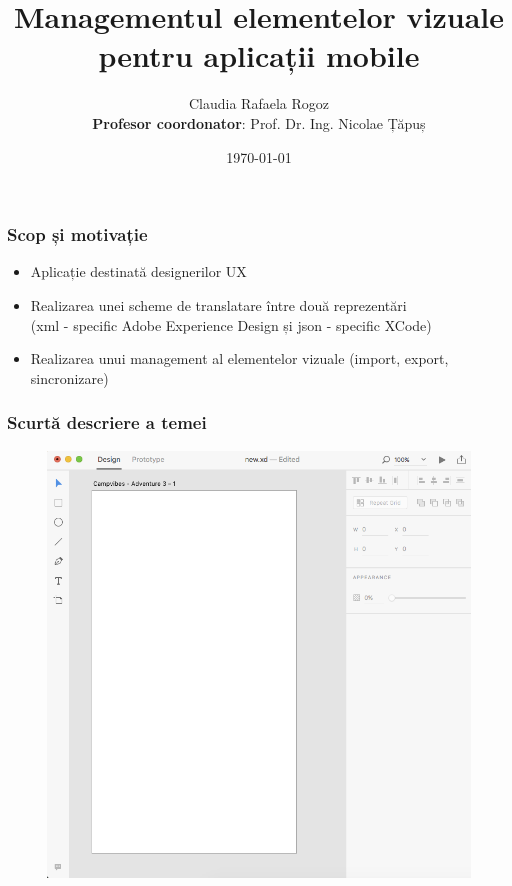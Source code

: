 \documentclass{beamer}
\title[Short title]{Managementul elementelor vizuale \\pentru aplicații mobile} %
\author{Claudia Rafaela Rogoz\\
  \textbf{Profesor coordonator}: Prof. Dr. Ing. Nicolae Țăpuș} %
\institute[UCLA] %
{
Facultatea de Automatică și Calculatoare,
Universitatea Politehnică București \\ %
\medskip
}
\date{\today} %
\begin{document}
\begin{frame}
\titlepage %
\end{frame}


\begin{frame}
\frametitle{Scop și motivație}
\begin{itemize}
\item Aplicație destinată designerilor UX
\item Realizarea unei scheme de translatare între două reprezentări \\ (xml - specific Adobe Experience Design și json - specific XCode)
\item Realizarea unui management al elementelor vizuale (import, export, sincronizare)
\end{itemize}
\end{frame}


\begin{frame}
\frametitle{Scurtă descriere a temei}
\begin{figure}
\includegraphics[scale=0.2]{img/scena.png}
\end{figure}
\end{frame}
\end{document}
